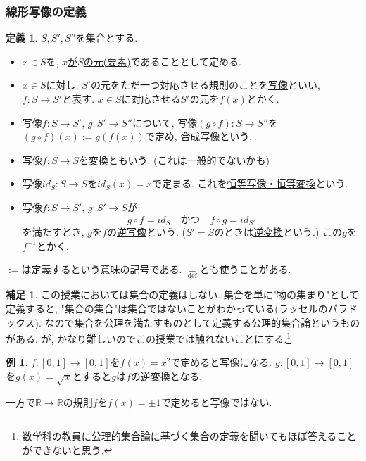 \documentclass[dvipdfmx,a4paper,11pt]{article} %
\newcommand{\R}{\mathbb{R}}
\theoremstyle{definition}
\newtheorem{dfn}[thm]{定義}
\newtheorem{rem}[thm]{補足}
\newtheorem{exa}[thm]{例}
\begin{document}
\subsubsection{線形写像の定義}
\begin{dfn}
$S, S', S''$を集合とする. 
\begin{itemize}
\item $x \in S$を, \underline{$x$が$S$の元(要素)}であることとして定める.
\item $x \in S$に対し, $S'$の元をただ一つ対応させる規則のことを\underline{写像}といい, $f : S \to S'$と表す. $x \in S$に対応させる$S'$の元を\underline{$f(x)$}とかく.
\item 写像$f : S \to S'$, $g : S' \to S''$について, 写像$(g \circ f) : S \to S''$を$(g \circ f)(x):=g (f(x))$で定め, \underline{合成写像}という. 
\item 写像$f : S \to S$を\underline{変換}ともいう. (これは一般的でないかも) 
\item 写像$id_S : S \to S$を$id_S(x)=x$で定まる. これを\underline{恒等写像・恒等変換}という. 
\item 写像$f : S \to S'$, $g : S' \to S$が
$$
g \circ f = id_{S} \quad \text{かつ} \quad f \circ g = id_{S'}
$$ 
を満たすとき, $g$を$f$の\underline{逆写像}という. ($S'=S$のときは\underline{逆変換}という.) この$g$を$f^{-1}$とかく. 
\end{itemize}
\end{dfn}
$:=$は定義するという意味の記号である. 
$\underset{\text{def}}{=}$とも使うことがある. 

\begin{rem}
この授業においては集合の定義はしない. 集合を単に"物の集まり"として定義すると, "集合の集合"は集合ではないことがわかっている(ラッセルのパラドックス). 
なので集合を公理を満たすものとして定義する公理的集合論というものがある. 
が, かなり難しいのでこの授業では触れないことにする.\footnote{数学科の教員に公理的集合論に基づく集合の定義を聞いてもほぼ答えることができないと思う.}
\end{rem}

\begin{exa}
$f : [0,1] \to [0,1]$を$f(x)=x^2$で定めると写像になる. 
$g : [0,1] \to [0,1]$を$g(x) = \sqrt{x}$とすると$g$は$f$の逆変換となる.

一方で$\R \to \R$の規則$f$を$f(x)=\pm1$で定めると写像ではない. 
\end{exa}
\end{document}
